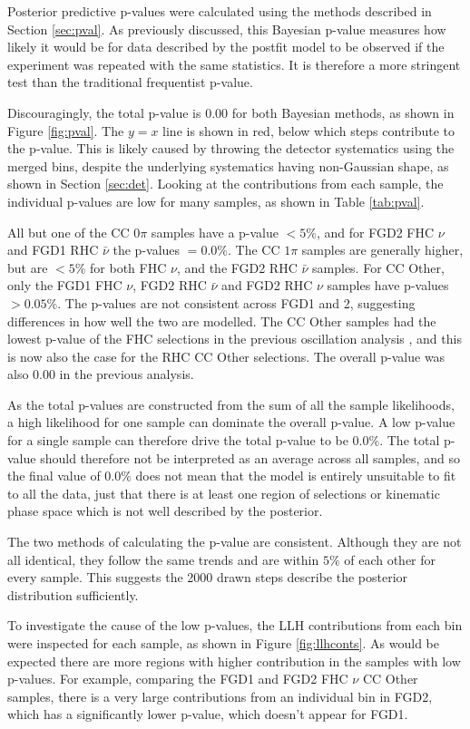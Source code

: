 Posterior predictive p-values were calculated using the methods described in Section \ref{sec:pval}. As previously discussed, this Bayesian p-value measures how likely it would be for data described by the postfit model to be observed if the experiment was repeated with the same statistics. It is therefore a more stringent test than the traditional frequentist p-value.

Discouragingly, the total p-value is 0.00 for both Bayesian methods, as shown in Figure \ref{fig:pval}. The $y=x$ line is shown in red, below which steps contribute to the p-value. This is likely caused by throwing the detector systematics using the merged bins, despite the underlying systematics having non-Gaussian shape, as shown in Section \ref{sec:det}. Looking at the contributions from each sample, the individual p-values are low for many samples, as shown in Table \ref{tab:pval}. 

All but one of the CC 0$\pi$ samples have a p-value $<5\%$, and for FGD2 FHC $\nu$ and FGD1 RHC $\bar{\nu}$ the p-values $=0.0\%$. The CC $1\pi$ samples are generally higher, but are $<5\%$ for both FHC $\nu$, and the FGD2 RHC $\bar{\nu}$ samples. For CC Other, only the FGD1 FHC $\nu$, FGD2 RHC $\bar{\nu}$ and FGD2 RHC $\nu$ samples have p-values $>0.05\%$. The p-values are not consistent across FGD1 and 2, suggesting differences in how well the two are modelled. The CC Other samples had the lowest p-value of the FHC selections in the previous oscillation analysis \cite{tn324}, and this is now also the case for the RHC CC Other selections. The overall p-value was also 0.00 in the previous analysis.

As the total p-values are constructed from the sum of all the sample likelihoods, a high likelihood for one sample can dominate the overall p-value. A low p-value for a single sample can therefore drive the total p-value to be 0.0$\%$. The total p-value should therefore not be interpreted as an average across all samples, and so the final value of 0.0$\%$ does not mean that the model is entirely unsuitable to fit to all the data, just that there is at least one region of selections or kinematic phase space which is not well described by the posterior.

The two methods of calculating the p-value are consistent. Although they are not all identical, they follow the same trends and are within $5\%$ of each other for every sample. This suggests the 2000 drawn steps describe the posterior distribution sufficiently.

To investigate the cause of the low p-values, the LLH contributions from each bin were inspected for each sample, as shown in Figure \ref{fig:llhconts}. As would be expected there are more regions with higher contribution in the samples with low p-values. For example, comparing the FGD1 and FGD2 FHC $\nu$ CC Other samples, there is a very large contributions from an individual bin in FGD2, which has a significantly lower p-value, which doesn't appear for FGD1.

